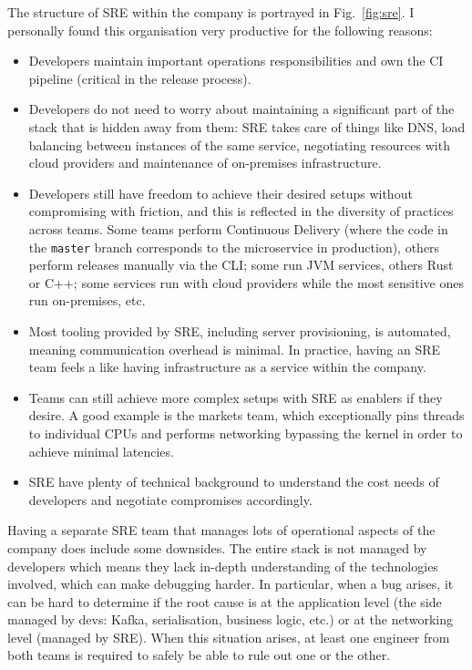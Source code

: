 \documentclass[conference]{IEEEtran}
\begin{document}
    The structure of SRE within the company is portrayed in Fig.~\ref{fig:sre}.
    I personally found this organisation very productive for the following reasons:
    \begin{itemize}
        \item Developers maintain important operations responsibilities and own the CI pipeline (critical in the release process).
        \item Developers do not need to worry about maintaining a significant part of the stack that is hidden away from them: SRE takes care of things like DNS, load balancing between instances of the same service, negotiating resources with cloud providers and maintenance of on-premises infrastructure.
        \item Developers still have freedom to achieve their desired setups without compromising with friction, and this is reflected in the diversity of practices across teams.
        Some teams perform Continuous Delivery (where the code in the \texttt{master} branch corresponds to the microservice in production), others perform releases manually via the CLI; some run JVM services, others Rust or C++;
        some services run with cloud providers while the most sensitive ones run on-premises, etc.
        \item Most tooling provided by SRE, including server provisioning, is automated, meaning communication overhead is minimal.
        In practice, having an SRE team feels a like having infrastructure as a service within the company.
        \item Teams can still achieve more complex setups with SRE as enablers
        if they desire.
        A good example is the markets team, which exceptionally pins threads to individual CPUs and performs networking bypassing the kernel in order to achieve minimal latencies.
        \item SRE have plenty of technical background to understand the cost needs of developers and negotiate compromises accordingly.
    \end{itemize}

    Having a separate SRE team that manages lots of operational aspects of the company does include some downsides.
    The entire stack is not managed by developers which means they lack in-depth understanding of the technologies involved, which can make debugging harder.
    In particular, when a bug arises, it can be hard to determine if the root cause is at the application level (the side managed by devs: Kafka, serialisation, business logic, etc.) or at the networking level (managed by SRE).
    When this situation arises, at least one engineer from both teams is required to safely be able to rule out one or the other.
\end{document}
